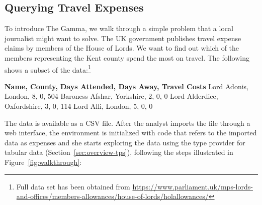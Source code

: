 \documentclass[manuscript,review,anonymous]{acmart}
\newcommand{\ikvd}[1]{{\fontfamily{zi4}\selectfont\small #1}}
\begin{document}
\subsection{Querying Travel Expenses}
\label{sec:overview-walk}

To introduce The Gamma, we walk through a simple problem that a local journalist might want to solve.
The UK government publishes travel expense claims by members of the House of Lords. We want to find
out which of the members representing the Kent county spend the most on travel.
The following shows a subset of the data:\footnote{Full data set has been obtained from
\url{https://www.parliament.uk/mps-lords-and-offices/members-allowances/house-of-lords/holallowances/} }

\begin{thegamma}
\textbf{Name, County, Days Attended, Days Away, Travel Costs}
Lord Adonis, London, 8, 0, 504
Baroness Afshar, Yorkshire, 2, 0, 0
Lord Alderdice, Oxfordshire, 3, 0, 114
Lord Alli, London, 5, 0, 0
\end{thegamma}

\noindent
The data is available as a CSV file. After the analyst imports the file through a web interface,
the environment is initialized with code that refers to the imported data as \ikvd{expenses}
and she starts exploring the data using the type provider for tabular data (Section~\ref{sec:overview-tps}),
following the steps illustrated in Figure~\ref{fig:walkthrough}:
\end{document}
